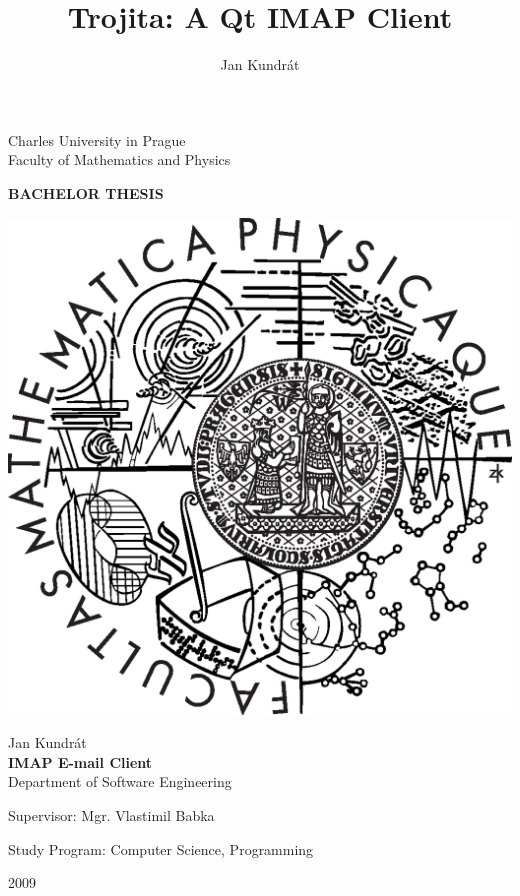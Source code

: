 \documentclass[12pt,notitlepage]{report}
\title{Trojita: A Qt IMAP Client}
\author{Jan Kundrát}
\begin{document}
\begin{titlepage}
\begin{center}

\vspace{15mm}

\large
Charles University in Prague\\
Faculty of Mathematics and Physics\\

\vspace{5mm}

{\Large\bf BACHELOR THESIS}

\vspace{10mm}

\includegraphics[scale=0.3]{logo.eps}

\vspace{15mm}

{\Large Jan Kundrát}\\
\vspace{5mm}
{\Large\bf IMAP E-mail Client}\\
\vspace{5mm}
Department of Software Engineering\\
\vspace{15mm}

\large
\noindent Supervisor: Mgr. Vlastimil Babka
\vspace{1mm} 

\noindent Study Program: Computer Science, Programming

\vspace{20mm}

2009
\end{center}

\end{titlepage}
\end{document}
